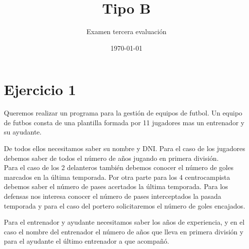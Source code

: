 \documentclass[4paper]{article}
\author{Examen tercera evaluación}
\title{Tipo B}
\date{\today}
\begin{document}
\maketitle 
\vspace{2cm}
\begin{center}
\begin{large}
\end{large}
\end{center}\par 
\vspace{0.5cm}
\section*{Ejercicio 1}
Queremos realizar un programa para la gestión de equipos de futbol. Un equipo de futbos consta de una plantilla formada por 11 jugadores mas un entrenador y su ayudante.\par
De todos ellos necesitamos saber su nombre y DNI. Para el caso de los  jugadores debemos saber de todos el número de años jugando en primera división.\\
Para el caso de los 2 delanteros también debemos conocer el número de goles marcados en la última temporada. Por otra parte para los 4 centrocampista debemos saber el número de pases acertados la última temporada. Para los defensas nos interesa conocer el número de pases interceptados la pasada temporada y para el caso del portero solicitaremos el número de goles encajados.\par 
Para el entrenador y ayudante necesitamos saber los años de experiencia, y en el caso el nombre del entrenador el número de años que lleva en primera división y para el ayudante el último entrenador a que acompañó.
\end{document}
